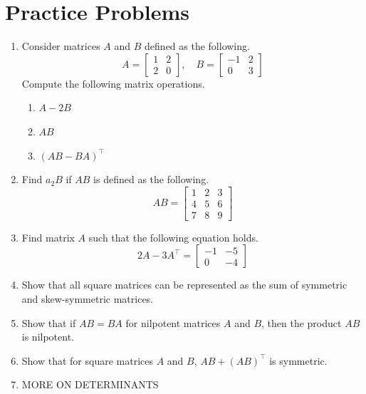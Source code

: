 \documentclass[../main.tex]{subfiles}
\begin{document}
\section{Practice Problems}
\begin{enumerate}
\item
Consider matrices $A$ and $B$ defined as the following.
\[
A =
\begin{bmatrix}
    1 & 2 \\
    2 & 0
\end{bmatrix},
\quad
B =
\begin{bmatrix}
    -1 & 2 \\
    0  & 3
\end{bmatrix}
\]
Compute the following matrix operations.
\begin{enumerate}[noitemsep]
\item $A - 2B$
\item $AB$
\item $(AB - BA)^\intercal$
\end{enumerate}

\item
Find $a_2B$ if $AB$ is defined as the following.
\[
AB =
\begin{bmatrix}
    1 & 2 & 3 \\
    4 & 5 & 6 \\
    7 & 8 & 9
\end{bmatrix}
\]

\item
Find matrix $A$ such that the following equation holds.
\[
2A - 3A^\intercal =
\begin{bmatrix}
    -1 & -5 \\
    0  & -4
\end{bmatrix}
\]

\item
Show that all square matrices can be represented as the sum of
symmetric and skew-symmetric matrices.

\item
Show that if $AB = BA$ for nilpotent matrices $A$ and $B$, then the
product $AB$ is nilpotent.

\item
Show that for square matrices $A$ and $B$, $AB + (AB)^\intercal$
is symmetric.

\item MORE ON DETERMINANTS
\end{enumerate}
\end{document}
